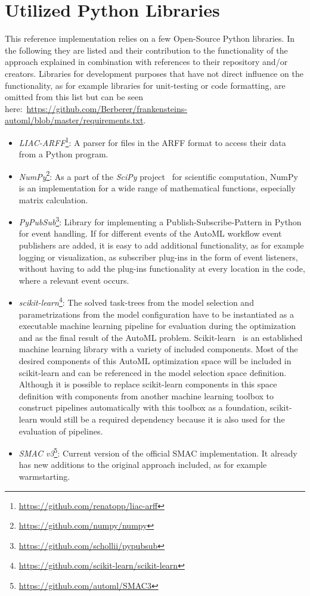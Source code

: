 \section{Utilized Python Libraries}
\label{sec:implementation:libraries}
This reference implementation relies on a few Open-Source Python libraries.
In the following they are listed and their contribution to the functionality of the approach explained in combination with references to their repository and/or creators.
Libraries for development purposes that have not direct influence on the functionality, as for example libraries for unit-testing or code formatting, are omitted from this list but can be seen here:~\url{https://github.com/Berberer/frankensteins-automl/blob/master/requirements.txt}. 
\begin{itemize}
    \item \textit{LIAC-ARFF}\footnote{\url{https://github.com/renatopp/liac-arff}}: A parser for files in the ARFF format to access their data from a Python program.
    \item \textit{NumPy}\footnote{\url{https://github.com/numpy/numpy}}: As a part of the \textit{SciPy} project~\cite{Virtanen-SciPy} for scientific computation, NumPy is an implementation for a wide range of mathematical functions, especially matrix calculation.
    \item \textit{PyPubSub}\footnote{\url{https://github.com/schollii/pypubsub}}: Library for implementing a Publish-Subscribe-Pattern in Python for event handling.
    If for different events of the AutoML workflow event publishers are added, it is easy to add additional functionality, as for example logging or visualization, as subscriber plug-ins in the form of event listeners, without having to add the plug-ins functionality at every location in the code, where a relevant event occurs.
    \item \textit{scikit-learn}\footnote{\url{https://github.com/scikit-learn/scikit-learn}}: The solved task-trees from the model selection and parametrizations from the model configuration have to be instantiated as a executable machine learning pipeline for evaluation during the optimization and as the final result of the AutoML problem.
    Scikit-learn~\cite{Pedregosa-Scikit-learn} is an established machine learning library with a variety of included components.
    Most of the desired components of this AutoML optimization space will be included in scikit-learn and can be referenced in the model selection space definition.
    Although it is possible to replace scikit-learn components in this space definition with components from another machine learning toolbox to construct pipelines automatically with this toolbox as a foundation, scikit-learn would still be a required dependency because it is also used for the evaluation of pipelines.
    \item \textit{SMAC v3}\footnote{\url{https://github.com/automl/SMAC3}}: Current version of the official SMAC implementation. It already has new additions to the original approach included, as for example warmstarting.
\end{itemize}


